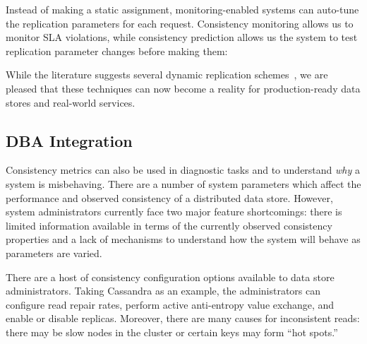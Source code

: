 Instead of making a static assignment, monitoring-enabled systems can
auto-tune the replication parameters for each request. Consistency
monitoring allows us to monitor SLA violations, while consistency
prediction allows us the system to test replication parameter changes
before making them:


While the literature suggests several dynamic replication
schemes~\cite{vahdat-article}, we are pleased that these techniques
can now become a reality for production-ready data stores and
real-world services.

\subsection{DBA Integration}
\label{sec:dba}

Consistency metrics can also be used in diagnostic tasks and to
understand \textit{why} a system is misbehaving. There are a number of
system parameters which affect the performance and observed
consistency of a distributed data store. However, system
administrators currently face two major feature shortcomings: there is
limited information available in terms of the currently observed
consistency properties and a lack of mechanisms to understand how
the system will behave as parameters are varied.


There are a host of consistency configuration options available to
data store administrators. Taking Cassandra as an example, the
administrators can configure read repair rates, perform active
anti-entropy value exchange, and enable or disable replicas. Moreover,
there are many causes for inconsistent reads: there may be slow nodes
in the cluster or certain keys may form ``hot spots.''


